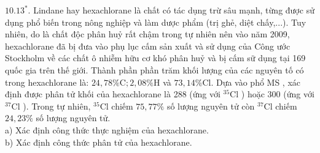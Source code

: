 \documentclass[10pt]{article}
\begin{document}
$10.13^{*}$. Lindane hay hexachlorane là chất có tác dụng trừ sâu mạnh, từng được sử dụng phổ biến trong nông nghiệp và làm dược phẩm (trị ghẻ, diệt chấy,...). Tuy nhiên, do là chất độc phân huỷ rất chậm trong tự nhiên nên vào năm 2009, hexachlorane đã bị đưa vào phụ lục cấm sản xuất và sử dụng của Công ước Stockholm về các chất ô nhiễm hữu cơ khó phân huỷ và bị cấm sữ dụng tại 169 quốc gia trên thế giới. Thành phần phần trăm khối lượng của các nguyên tố có trong hexachlorane là: $24,78 \% \mathrm{C} ; 2,08 \% \mathrm{H}$ và $73,14 \% \mathrm{Cl}$. Dựa vào phổ MS , xác định được phân tử khối của hexachlorane là 288 (ứng với ${ }^{35} \mathrm{Cl}$ ) hoặc 300 (ứng với ${ }^{37} \mathrm{Cl}$ ). Trong tự nhiên, ${ }^{35} \mathrm{Cl}$ chiếm $75,77 \%$ số lượng nguyên tử còn ${ }^{37} \mathrm{Cl}$ chiếm $24,23 \%$ số lượng nguyên tử.\\
a) Xác định công thức thực nghiệm của hexachlorane.\\
b) Xác định công thức phân tử của hexachlorane.
\end{document}

